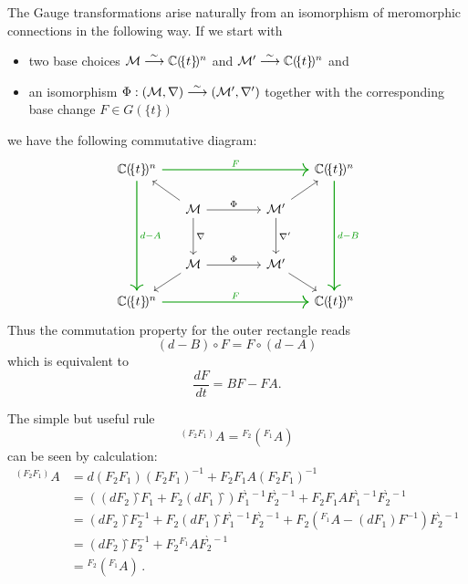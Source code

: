\begin{rem}
  The Gauge transformations arise naturally from an isomorphism of meromorphic
  connections in the following way.
  If we start with
  \begin{itemize}
  \item two base choices $\mathcal{M}\overset{\sim}\longrightarrow\mathbb{C}(\!\{t\}\!)^n$
    and $\mathcal{M}'\overset{\sim}\longrightarrow\mathbb{C}(\!\{t\}\!)^n$ and
  \item an isomorphism
    $\Phi:(\mathcal{M},\nabla)\overset{\sim}\longrightarrow(\mathcal{M}',\nabla')$ together
    with the corresponding base change $F\in G(\!\{t\}\!)$
  \end{itemize}
  we have the following commutative diagram:
  \[ \begin{tikzcd}[column sep=.5cm,row sep=.5cm]
      \C(\!\{t\}\!)^n
      \arrow[green!60!black,thick]{rrrrr}{F}
      \arrow[green!60!black,thick]{dddd}{d-A}&&&&&
      \C(\!\{t\}\!)^n\arrow[green!60!black,thick]{dddd}{d-B}
      \\ & \cM \arrow{dd}{\nabla}\arrow{rrr}{\Phi}\ular&&&
      \cM'\arrow{dd}{\nabla'}\urar
      \\
      \\ & \cM \arrow{rrr}{\Phi}\dlar&&& \cM'\drar
      \\ \C(\!\{t\}\!)^n \arrow[green!60!black,thick]{rrrrr}{F}&&&&&
      \C(\!\{t\}\!)^n
    \end{tikzcd} \]
  Thus the commutation property for the outer rectangle reads
  \[
    (d-B)\circ F=F\circ(d-A)
  \]
  which is equivalent to
  \[
    \frac{dF}{dt}=BF-FA.
  \]
\end{rem}
\begin{rem}\label{rem:distributingTransforamtionRule}
  The simple but useful rule
  \[
    {}^{(F_2F_1)}\!A =
    {}^{F_2}\!\left({}^{F_1}\!A\right)
  \]
  can be seen by calculation:
  \begin{align*}
    {}^{(F_2F_1)}\!A
    &= d(F_2F_1)(F_2F_1)^{-1}+F_2F_1 A(F_2F_1)^{-1}
  \\&=\left(
      \left(dF_2\right)̂F_1
      +F_2\left(dF_1\right)̂
    \right) F_1^{̀-1} F_2^{̀-1}
    +F_2F_1 A F_1^{̀-1}F_2^{̀-1}
  \\&= \left(dF_2\right)̂F_2^{-1}
     +F_2\left(dF_1\right)̂ F_1^{̀-1} F_2^{̀-1}
     +F_2
     \left(
       {}^{F_1}\!A-\left(dF_1\right)F^{-1}
     \right)
     F_2^{̀-1}
  \\&= \left(dF_2\right)̂F_2^{-1} +F_2 {}^{F_1}\!A F_2^{̀-1}
  \\&= {}^{F_2}\!\left({}^{F_1}\!A\right) \,.
  \end{align*}
\end{rem}
